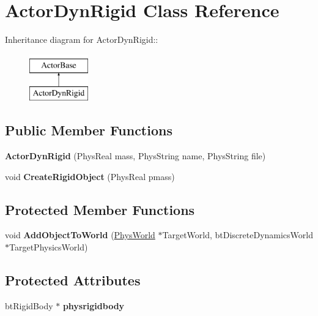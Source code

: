 \hypertarget{classActorDynRigid}{
\section{ActorDynRigid Class Reference}
\label{d4/d0e/classActorDynRigid}
}
Inheritance diagram for ActorDynRigid::\begin{figure}[H]
\begin{center}
\leavevmode
\includegraphics[height=2cm]{d4/d0e/classActorDynRigid}
\end{center}
\end{figure}
\subsection*{Public Member Functions}
\begin{DoxyCompactItemize}
\item 
\hypertarget{classActorDynRigid_aaa5408c9d297c7042121de7a5ae93697}{
{\bfseries ActorDynRigid} (PhysReal mass, PhysString name, PhysString file)}
\label{d4/d0e/classActorDynRigid_aaa5408c9d297c7042121de7a5ae93697}

\item 
\hypertarget{classActorDynRigid_a93052967ae8e6bebb810a5303ebc2a48}{
void {\bfseries CreateRigidObject} (PhysReal pmass)}
\label{d4/d0e/classActorDynRigid_a93052967ae8e6bebb810a5303ebc2a48}

\end{DoxyCompactItemize}
\subsection*{Protected Member Functions}
\begin{DoxyCompactItemize}
\item 
\hypertarget{classActorDynRigid_ad598729bca37f568a312b8f7a08ce68c}{
void {\bfseries AddObjectToWorld} (\hyperlink{classPhysWorld}{PhysWorld} $\ast$TargetWorld, btDiscreteDynamicsWorld $\ast$TargetPhysicsWorld)}
\label{d4/d0e/classActorDynRigid_ad598729bca37f568a312b8f7a08ce68c}

\end{DoxyCompactItemize}
\subsection*{Protected Attributes}
\begin{DoxyCompactItemize}
\item 
\hypertarget{classActorDynRigid_a83a6cb758304431043c6bfa05b47ecb2}{
btRigidBody $\ast$ {\bfseries physrigidbody}}
\label{d4/d0e/classActorDynRigid_a83a6cb758304431043c6bfa05b47ecb2}

\end{DoxyCompactItemize}


